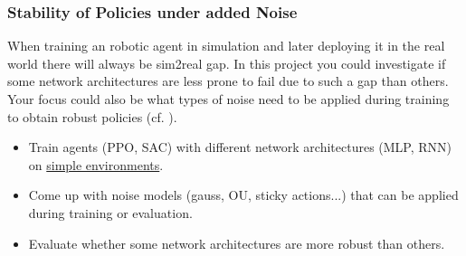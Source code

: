 \documentclass[a4paper]{article}
\begin{document}


\subsubsection{Stability of Policies under added Noise}
When training an robotic agent in simulation and later deploying it in the real world there will always be sim2real gap.
In this project you could investigate if some network architectures are less prone to fail due to such a gap than others.
Your focus could also be what types of noise need to be applied during training to obtain robust policies (cf. \citet{Sinha2021}).
\begin{itemize}
  \item Train agents (PPO, SAC) with different network architectures (MLP, RNN) on \href{https://gymnasium.farama.org/environments/mujoco/}{simple environments}.
  \item Come up with noise models (gauss, OU, sticky actions...) that can be applied during training or evaluation.
  \item Evaluate whether some network architectures are more robust than others.
\end{itemize}




\end{document}
